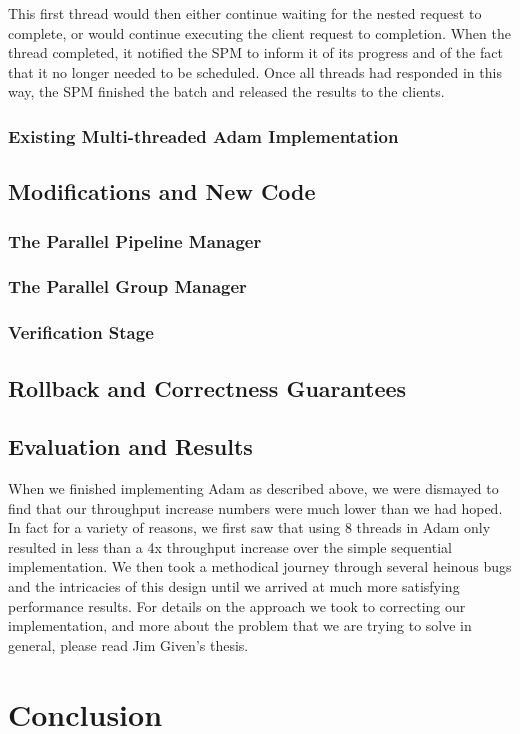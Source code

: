 \documentclass[11pt, oneside]{report}
\begin{document}
This first thread would then either continue waiting for the nested request to complete, or would continue executing the client request to completion. When the thread completed, it notified the SPM to inform it of its progress and of the fact that it no longer needed to be scheduled. Once all threads had responded in this way, the SPM finished the batch and released the results to the clients.

\subsection{Existing Multi-threaded Adam Implementation}

\section{Modifications and New Code}

\subsection{The Parallel Pipeline Manager}

\subsection{The Parallel Group Manager}

\subsection{Verification Stage}

\section{Rollback and Correctness Guarantees}

\section{Evaluation and Results}

When we finished implementing Adam as described above, we were dismayed to find that our throughput increase numbers were much lower than we had hoped. In fact for a variety of reasons, we first saw that using 8 threads in Adam only resulted in less than a 4x throughput increase over the simple sequential implementation. We then took a methodical journey through several heinous bugs and the intricacies of this design until we arrived at much more satisfying performance results. For details on the approach we took to correcting our implementation, and more about the problem that we are trying to solve in general, please read Jim Given's thesis.

\chapter{Conclusion}
\end{document}
